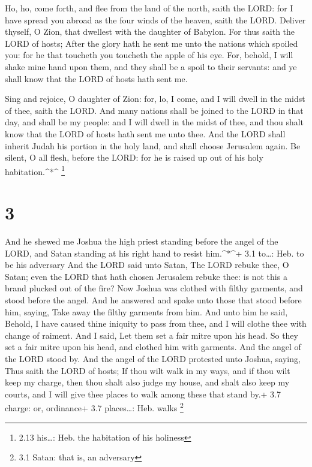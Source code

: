  Ho, ho, come forth, and flee from the land of the north,
saith the LORD: for I have spread you abroad as the four winds of the
heaven, saith the LORD.  Deliver thyself, O Zion, that
dwellest with the daughter of Babylon.  For thus saith the
LORD of hosts; After the glory hath he sent me unto the nations which
spoiled you: for he that toucheth you toucheth the apple of his eye.
 For, behold, I will shake mine hand upon them, and they
shall be a spoil to their servants: and ye shall know that the LORD of
hosts hath sent me.

 Sing and rejoice, O daughter of Zion: for, lo, I come, and
I will dwell in the midst of thee, saith the LORD.  And
many nations shall be joined to the LORD in that day, and shall be my
people: and I will dwell in the midst of thee, and thou shalt know that
the LORD of hosts hath sent me unto thee.  And the LORD
shall inherit Judah his portion in the holy land, and shall choose
Jerusalem again.  Be silent, O all flesh, before the LORD:
for he is raised up out of his holy habitation.\^{}*\^{} \footnote{2.13
  his\ldots: Heb. the habitation of his holiness}

\hypertarget{section-2}{%
\section{3}\label{section-2}}

 And he shewed me Joshua the high priest standing before the
angel of the LORD, and Satan standing at his right hand to resist
him.\^{}*\^{}+ 3.1 to\ldots: Heb. to be his adversary  And
the LORD said unto Satan, The LORD rebuke thee, O Satan; even the LORD
that hath chosen Jerusalem rebuke thee: is not this a brand plucked out
of the fire?  Now Joshua was clothed with filthy garments,
and stood before the angel.  And he answered and spake unto
those that stood before him, saying, Take away the filthy garments from
him. And unto him he said, Behold, I have caused thine iniquity to pass
from thee, and I will clothe thee with change of raiment. 
And I said, Let them set a fair mitre upon his head. So they set a fair
mitre upon his head, and clothed him with garments. And the angel of the
LORD stood by.  And the angel of the LORD protested unto
Joshua, saying,  Thus saith the LORD of hosts; If thou wilt
walk in my ways, and if thou wilt keep my charge, then thou shalt also
judge my house, and shalt also keep my courts, and I will give thee
places to walk among these that stand by.+ 3.7 charge: or, ordinance+
3.7 places\ldots: Heb. walks \footnote{3.1 Satan: that is, an adversary}

